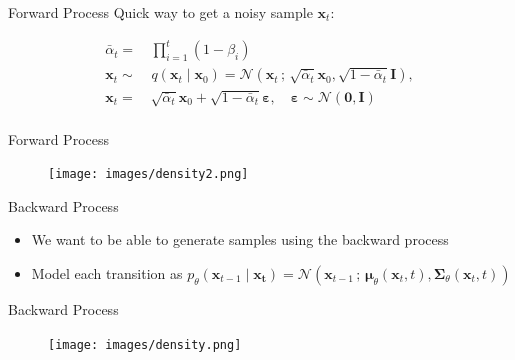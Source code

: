 \documentclass{beamer}
\begin{document}

\begin{frame}{Forward Process}
    Quick way to get a noisy sample $\bm{x}_t$:

    \vspace{0.6cm}

    \begin{align*}
        \bar{\alpha}_t = & \, \prod_{i=1}^t (1 - \beta_i) \\
        \bm{x}_t \sim & \ q(\bm{x}_t \mid \bm{x}_{0}) = \mathcal{N}(\bm{x}_t \, ; \, \sqrt{\bar{\alpha}_t} \bm{x}_0, \sqrt{1-\bar{\alpha}_t} \bm{I}), \\
        \bm{x}_t = & \, \sqrt{\bar{\alpha}_t} \bm{x}_0 + \sqrt{1-\bar{\alpha}_t} \bm{\varepsilon}, \quad \bm{\varepsilon} \sim \mathcal{N}(\bm{0}, \bm{I}) \\
    \end{align*}
    
\end{frame}


\begin{frame}{Forward Process}

    \begin{figure}[H]
        \centering
        \texttt{[image: images/density2.png]}
    \end{figure}

\end{frame}


\begin{frame}{Backward Process}

\begin{itemize}
    \setlength\itemsep{1.5em}
    \item We want to be able to generate samples using the backward process
    \pause
    \item Model each transition as $p_{\theta}(\bm{x}_{t-1} \mid \bm{x_t}) = \mathcal{N}(\bm{x}_{t-1} \, ; \, \bm{\mu}_{\theta}(\bm{x}_t, t), \bm{\Sigma}_{\theta}(\bm{x}_t, t))$
\end{itemize}
    
\end{frame}


\begin{frame}{Backward Process}

    \begin{figure}[H]
        \centering
        \texttt{[image: images/density.png]}
    \end{figure}

\end{frame}

\end{document}
